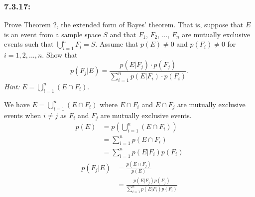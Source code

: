 \documentclass[a4paper]{article}
\begin{document}
\subsubsection*{7.3.17:}
Prove Theorem 2, the extended form of Bayes' theorem. That is, suppose that $E$ is an event from a sample space $S$ and that $F_1$, $F_2$, ..., $F_n$ are mutually exclusive events such that $\bigcup_{i=1}^{n} F_i = S$. Assume that $p(E) \neq 0$ and $p(F_i) \neq 0$ for $i=1,2,...,n$. Show that
\begin{equation*}
	p(F_j|E) = \frac{p(E|F_j)\cdot p(F_j)}{\sum_{i=1}^n p(E|F_i)\cdot p(F_i)}.
\end{equation*}
\emph{Hint: } $E=\bigcup_{i=1}^n (E\cap F_i)$.

We have $E=\bigcup_{i=1}^n (E\cap F_i)$ where $E \cap F_i$ and $E \cap F_j$ are mutually exclusive events when $i \neq j$ as $F_i$ and $F_j$ are mutually exclusive events.
\begin{align*}
	p(E) & = p(\bigcup_{i=1}^n (E\cap F_i)) \\
	     & = \sum_{i=1}^n p(E \cap F_i)     \\
	     & = \sum_{i=1}^n p(E|F_i) p(F_i)
\end{align*}
\begin{align*}
	p(F_j|E) & = \frac{p(E \cap F_j)}{p(E)}                         \\
	         & = \frac{p(E|F_j)p(F_j)}{\sum_{i=1}^n p(E|F_i)p(F_i)}
\end{align*}

\end{document}
